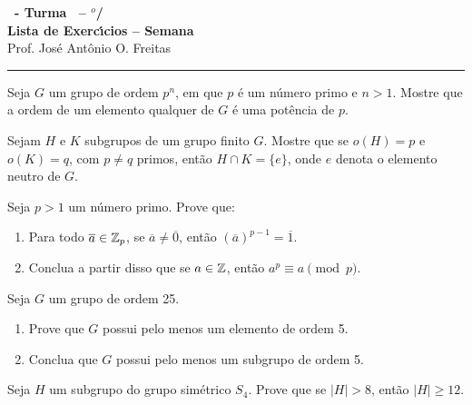 \documentclass[12pt]{exam}
\begin{document}
\begin{center}

    {\Large\bf \disciplina\ - Turma \turma\ -- \semestre$^{o}$/\ano} \\ \vspace{9pt} {\large\bf
        Lista de Exerc{\'\i}cios -- Semana \numerosemana}\\ \vspace{9pt} Prof. Jos{\'e} Ant{\^o}nio O. Freitas
    \end{center}
    \hrule

    \vspace{.6cm}

    \questao{} Seja $G$ um grupo de ordem $p^n$, em que $p$ \'e um n\'umero primo e $n > 1$. Mostre que a ordem de um elemento qualquer de $G$ \'e uma pot\^encia de $p$.

    \vspace{.3cm}

    \questao{} Sejam $H$ e $K$ subgrupos de um grupo finito $G$. Mostre que se $o(H) = p$ e $o(K) = q$, com $p \ne q$ primos, ent\~ao $H \cap K = \{e\}$, onde $e$ denota o elemento neutro de $G$.

    \vspace{.3cm}

    \questao{} Seja $p > 1$ um n\'umero primo. Prove que:
    \begin{enumerate}[label=({\alph*})]
      \item Para todo $\overline{a} \in \mathbb{Z}_p$, se $\overline{a} \ne \overline{0}$, ent\~ao $(\overline{a})^{p-1} = \overline{1}$.

      \item Conclua a partir disso que se $a \in \mathbb{Z}$, ent\~ao $a^p \equiv a \pmod p$.
    \end{enumerate}

    \vspace{.3cm}

    \questao{} Seja $G$ um grupo de ordem 25.
    \begin{enumerate}[label=({\alph*})]
        \item Prove que $G$ possui pelo menos um elemento de ordem 5.

        \item Conclua que $G$ possui pelo menos um subgrupo de ordem 5.
    \end{enumerate}

    \vspace{.3cm}

    \questao{} Seja $H$ um subgrupo do grupo simétrico $S_4$. Prove que se $|H| > 8$, então $|H| \ge 12$.
\end{document}
